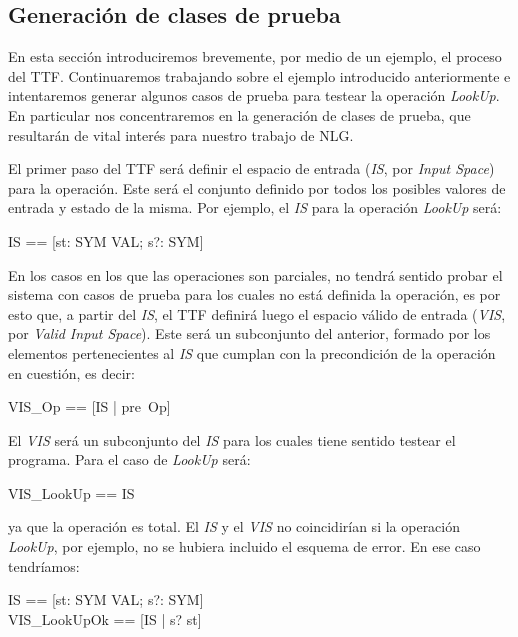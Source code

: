 \subsection{Generación de clases de prueba}
\label{sec:tacticas-testing}

En esta sección introduciremos brevemente, por medio de un ejemplo, el proceso del TTF. Continuaremos trabajando sobre el ejemplo introducido anteriormente e intentaremos generar algunos casos de prueba para testear la operación \emph{LookUp}. En particular nos concentraremos en la generación de clases de prueba, que resultarán de vital interés para nuestro trabajo de NLG.

El primer paso del TTF será definir el espacio de entrada (\emph{IS}, por \emph{Input Space}) para la operación. Este será el conjunto definido por todos los posibles valores de entrada y estado de la misma. Por ejemplo, el \emph{IS} para la operación \emph{LookUp} será:

\begin{zed}
  IS == [st: SYM \pfun VAL; s?: SYM]
\end{zed}

En los casos en los que las operaciones son parciales, no tendrá sentido probar el sistema con casos de prueba para los cuales no está definida la operación, es por esto que, a partir del \emph{IS}, el TTF definirá luego el espacio válido de entrada (\emph{VIS}, por \emph{Valid Input Space}). Este será un subconjunto del anterior, formado por los elementos pertenecientes al \emph{IS} que cumplan con la precondición de la operación en cuestión, es decir:

\begin{zed}
  VIS_{Op} == [IS | pre~Op]
\end{zed}

El \emph{VIS} será un subconjunto del \emph{IS} para los cuales tiene sentido testear el programa. Para el caso de \emph{LookUp} será:

\begin{zed}
  VIS_{LookUp} == IS
\end{zed}

\noindent
ya que la operación es total. El \emph{IS} y el \emph{VIS} no coincidirían si la operación \emph{LookUp}, por ejemplo, no se hubiera incluido el esquema de error. En ese caso tendríamos:

\begin{zed}
  IS == [st: SYM \pfun VAL; s?: SYM] \\
  VIS_{LookUpOk} == [IS | s? \in \dom st]
\end{zed}

